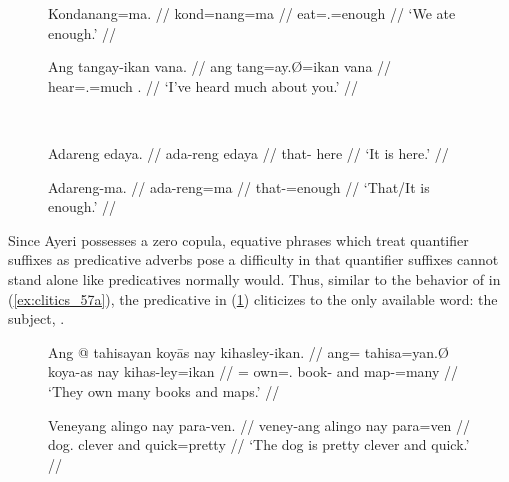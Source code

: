 \begin{figure}
\begin{minipage}[t]{.55\remaining}
\pex\label{ex:clitics_57}
\a\label{ex:clitics_57a}\begingl
	\gla Kondanang=ma. //
	\glb kond=nang=ma //
	\glc eat=\Fpl{}.\Aarg{}=enough //
	\glft `We ate enough.' //
\endgl

\a\label{ex:clitics_57b}\begingl
	\gla Ang tangay-ikan vana. //
	\glb ang tang=ay.Ø=ikan vana //
	\glc \AgtT{} hear=\Fsg{}.\Top{}=much \Second{}.\Gen{} //
	\glft `I've heard much about you.' //
\endgl
\xe
\end{minipage}
~
\begin{minipage}[t]{.45\remaining}
\pex\label{ex:clitics_58}
\a\label{ex:clitics_58a}\begingl
	\gla Adareng edaya. //
	\glb ada-reng edaya //
	\glc that-\AargI{} here //
	\glft `It is here.' //
\endgl

\a\label{ex:clitics_58b}\begingl
	\gla Adareng-ma. //
	\glb ada-reng=ma //
	\glc that-\AargI{}=enough //
	\glft `That/It is enough.' //
\endgl
\xe
\end{minipage}
\end{figure}

Since Ayeri possesses a zero copula, equative phrases which treat quantifier
suffixes as predicative adverbs pose a difficulty in that quantifier suffixes
cannot stand alone like predicatives normally would. Thus, similar to the
behavior of  in (\ref{ex:clitics_57a}), the predicative
 in (\ref{ex:clitics_58b}) cliticizes to the only available word:
the subject, .

\begin{figure}
\pex\label{ex:clitics_59}
\a\label{ex:clitics_59a}\begingl
	\gla Ang @ tahisayan koyās nay kihasley-ikan. //
	\glb ang= tahisa=yan.Ø koya-as nay kihas-ley=ikan //
	\glc \AgtT{}= own=\TplM{}.\Top{} book-\Parg{} and map-\PargI{}=many //
	\glft `They own many books and maps.' //
\endgl

\a\label{ex:clitics_59b}\begingl
	\gla Veneyang alingo nay para-ven. //
	\glb veney-ang alingo nay para=ven //
	\glc dog.\Aarg{} clever and quick=pretty //
	\glft `The dog is pretty clever and quick.' //
\endgl
\xe
\end{figure}

